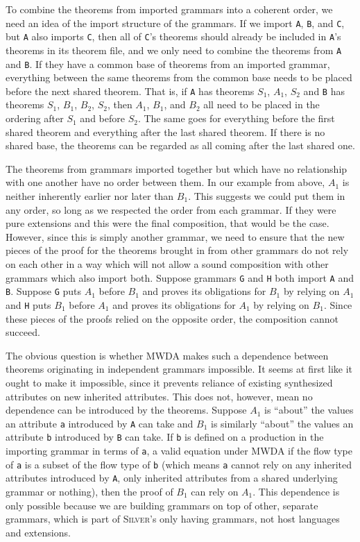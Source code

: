 \documentclass[11pt]{article}
\newcommand{\grammar}[1]{\texttt{#1}}
\newcommand{\attr}[1]{\texttt{#1}}
\newcommand{\silver}{\textsc{Silver}}
\begin{document}
To combine the theorems from imported grammars into a coherent order,
we need an idea of the import structure of the grammars.  If we import
\grammar{A}, \grammar{B}, and \grammar{C}, but \grammar{A} also
imports \grammar{C}, then all of \grammar{C}'s theorems should already
be included in \grammar{A}'s theorems in its theorem file, and we only
need to combine the theorems from \grammar{A} and \grammar{B}.  If
they have a common base of theorems from an imported grammar,
everything between the same theorems from the common base needs to be
placed before the next shared theorem.  That is, if \grammar{A} has
theorems $S_1$, $A_1$, $S_2$ and \grammar{B} has theorems $S_1$,
$B_1$, $B_2$, $S_2$, then $A_1$, $B_1$, and $B_2$ all need to be
placed in the ordering after $S_1$ and before $S_2$.  The same goes
for everything before the first shared theorem and everything after
the last shared theorem.  If there is no shared base, the theorems can
be regarded as all coming after the last shared one.


The theorems from grammars imported together but which have no
relationship with one another have no order between them.  In our
example from above, $A_1$ is neither inherently earlier nor later than
$B_1$.  This suggests we could put them in any order, so long as we
respected the order from each grammar.
%
If they were pure extensions and this were the final composition, that
would be the case.  However, since this is simply another grammar, we
need to ensure that the new pieces of the proof for the theorems
brought in from other grammars do not rely on each other in a way
which will not allow a sound composition with other grammars which
also import both.
%
Suppose grammars \grammar{G} and \grammar{H} both import \grammar{A}
and \grammar{B}.  Suppose \grammar{G} puts $A_1$ before $B_1$ and
proves its obligations for $B_1$ by relying on $A_1$ and \grammar{H}
puts $B_1$ before $A_1$ and proves its obligations for $A_1$ by
relying on $B_1$.  Since these pieces of the proofs relied on the
opposite order, the composition cannot succeed.


The obvious question is whether MWDA makes such a dependence between
theorems originating in independent grammars impossible.  It seems at
first like it ought to make it impossible, since it prevents reliance
of existing synthesized attributes on new inherited attributes.  This
does not, however, mean no dependence can be introduced by the
theorems.  Suppose $A_1$ is ``about'' the values an attribute \attr{a}
introduced by \grammar{A} can take and $B_1$ is similarly ``about''
the values an attribute \attr{b} introduced by \grammar{B} can take.
If \attr{b} is defined on a production in the importing grammar in
terms of \attr{a}, a valid equation under MWDA if the flow type of
\attr{a} is a subset of the flow type of \attr{b} (which means
\attr{a} cannot rely on any inherited attributes introduced by
\grammar{A}, only inherited attributes from a shared underlying
grammar or nothing), then the proof of $B_1$ can rely on $A_1$.
%
This dependence is only possible because we are building grammars on
top of other, separate grammars, which is part of \silver{}'s only
having grammars, not host languages and extensions.
\end{document}
